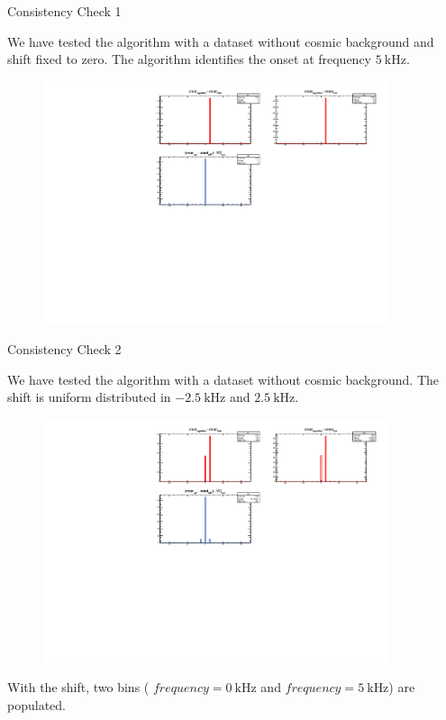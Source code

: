 \documentclass[8pt]{beamer}
\begin{document}
\begin{frame}{Consistency Check 1}

We have tested the algorithm with a dataset without cosmic background and shift fixed to zero. The algorithm identifies the onset at frequency $\SI{5}{\kilo \hertz}$.

\begin{figure}
\includegraphics[width = 0.9\textwidth]{../Plot/OnsetResult.pdf}
\end{figure} 
\end{frame}

\begin{frame}{Consistency Check 2}

We have tested the algorithm with a dataset without cosmic background. The shift is uniform distributed in $\SI{-2.5}{\kilo \hertz}$ and $\SI{+2.5}{\kilo \hertz}$.

\begin{figure}
\includegraphics[width = 0.9\textwidth]{../Plot/OnsetResult7.pdf}
\end{figure} 

With the shift, two bins ( $frequency = \SI{0}{\kilo \hertz}$ and $frequency = \SI{5}{\kilo \hertz}$) are populated.
\end{frame}
\end{document}
